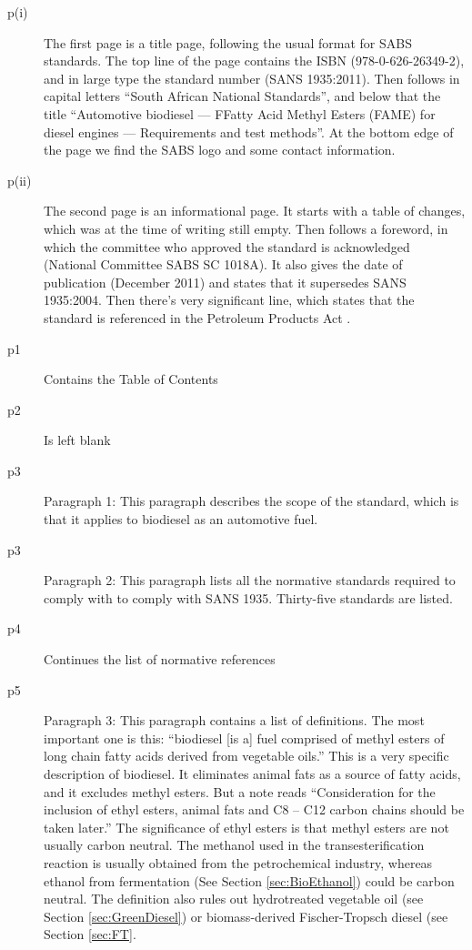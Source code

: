 \begin{description}


\item[p(i)]{The first page is a title page, following the usual format for SABS
standards. The top line of the page contains the ISBN (978-0-626-26349-2), and
in large type the standard number (SANS 1935:2011). Then follows in capital
letters ``South African National Standards'', and below that the title
``Automotive biodiesel --- FFatty Acid Methyl Esters (FAME) for diesel engines
--- Requirements and test methods''. At the bottom edge of the page we find the
SABS logo and some contact information.}

\item[p(ii)]{The second page is an informational page. It starts with a table of
changes, which was at the time of writing still empty. Then follows a foreword,
in which the committee who approved the standard is acknowledged (National
Committee SABS SC 1018A). It also gives the date of publication (December 2011)
and states that it supersedes SANS 1935:2004. Then there's very significant
line, which states that the standard is referenced in the Petroleum Products Act
\autocite{Act120-1997}. }
	
\item[p1]{Contains the Table of Contents} 

\item[p2]{Is left blank}

\item[p3]{Paragraph 1: This paragraph describes the scope of the standard, which
is that it applies to biodiesel as an automotive fuel.} 

\item[p3]{Paragraph 2:
This paragraph lists all the normative standards required to comply with to
comply with SANS 1935. Thirty-five standards are listed.} 

\item[p4]{Continues the list of normative references}

\item[p5]{Paragraph 3: This paragraph contains a list of definitions. The most
important one is this: ``biodiesel [is a] fuel comprised of methyl esters of
long chain fatty acids derived from vegetable oils.'' This is a very specific
description of biodiesel. It eliminates animal fats as a source of fatty acids,
and it excludes methyl esters. But a note reads ``Consideration for the
inclusion of ethyl esters, animal fats and C8 – C12 carbon chains should be
taken later.'' The significance of ethyl esters is that methyl esters are not
usually carbon neutral. The methanol used in the transesterification reaction is
usually obtained from the petrochemical industry, whereas ethanol from
fermentation (See Section \ref{sec:BioEthanol}) could be carbon neutral. The
definition also rules out hydrotreated vegetable oil (see Section
\ref{sec:GreenDiesel}) or biomass-derived Fischer-Tropsch diesel (see Section
\ref{sec:FT}.}


\end{description}
